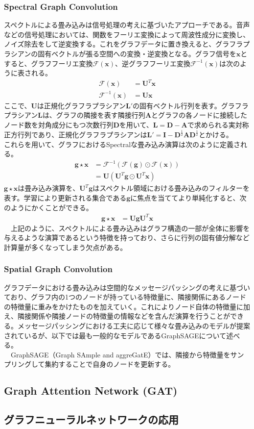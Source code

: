 \subsubsection{Spectral Graph Convolution}
スペクトルによる畳み込みは信号処理の考えに基づいたアプローチである。音声などの信号処理においては、関数をフーリエ変換によって周波性成分に変換し、ノイズ除去をして逆変換する。これをグラフデータに置き換えると、グラフラプラシアンの固有ベクトルが張る空間への変換・逆変換となる。グラフ信号を$\mathbf{x}$とすると、グラフフーリエ変換$\mathscr{F}(\mathbf{x})$、逆グラフフーリエ変換$\mathscr{F}^{-1}(\mathbf{x})$は次のように表される。
\begin{align}
\mathscr{F}(\mathbf{x}) &= \mathbf{U}^T\mathbf{x}\\
\mathscr{F}^{-1}(\mathbf{x}) &= \mathbf{U}\mathbf{x}
\end{align}
ここで、$\mathbf{U}$は正規化グラフラプラシアン$\mathbf{L}'$の固有ベクトル行列を表す。グラフラプラシアン$\mathbf{L}$は、グラフの隣接を表す隣接行列$\mathbf{A}$とグラフの各ノードに接続したノード数を対角成分にもつ次数行列$\mathbf{D}$を用いて、$\mathbf{L} = \mathbf{D}-  \mathbf{A}$で求められる実対称正方行列であり、正規化グラフラプラシアンは$\mathbf{L}' = \mathbf{I} - \mathbf{D}^{\frac{1}{2}} \mathbf{A} \mathbf{D}^{\frac{1}{2}}$とかける。\\
これらを用いて、グラフにおけるSpectralな畳み込み演算は次のように定義される。
\begin{align}
\mathbf{g} \star \mathbf{x} &= \mathscr{F}^{-1}(\mathscr{F}(\mathbf{g}) \odot \mathscr{F}(\mathbf{x}))\\
&= \mathbf{U}(\mathbf{U}^T \mathbf{g} \odot \mathbf{U}^T \mathbf{x})
\end{align}
$\mathbf{g} \star \mathbf{x}$は畳み込み演算を、$\mathbf{U}^T \mathbf{g}$はスペクトル領域における畳み込みのフィルターを表す。学習により更新される集合である$\mathbf{g}$に焦点を当ててより単純化すると、次のようにかくことができる。\\
\begin{align}
\mathbf{g} \star \mathbf{x} &= \mathbf{U} \mathbf{g} \mathbf{U}^T \mathbf{x}
\end{align}
　上記のように、スペクトルによる畳み込みはグラフ構造の一部が全体に影響を与えるような演算であるという特徴を持っており、さらに行列の固有値分解など計算量が多くなってしまう欠点がある。
\subsubsection{Spatial Graph Convolution}
グラフデータにおける畳み込みは空間的なメッセージパッシングの考えに基づいており、グラフ内の1つのノードが持っている特徴量に、隣接関係にあるノードの特徴量に重みをかけたものを加えていく。これによりノード自体の特徴量に加え、隣接関係や隣接ノードの特徴量の情報などを含んだ演算を行うことができる。メッセージパッシングにおける工夫に応じて様々な畳み込みのモデルが提案されているが、以下では最も一般的なモデルであるGraphSAGEについて述べる。\\
　GraphSAGE（Graph SAmple and aggreGatE）では、隣接から特徴量をサンプリングして集約することで自身のノードを更新する。
\subsection{Graph Attention Network (GAT)}

\subsection{グラフニューラルネットワークの応用}